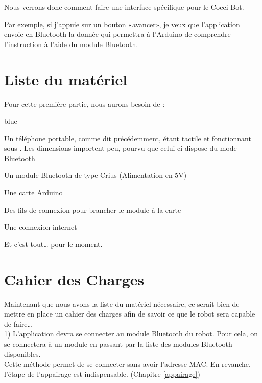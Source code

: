 \noindent
Nous verrons donc comment faire une interface spécifique pour le Cocci-Bot. \\




Par exemple, si j'appuie sur un bouton «avancer», je veux que l'application envoie en Bluetooth la donnée qui permettra à l'Arduino de comprendre l'instruction  à l'aide  du module Bluetooth.


\section{Liste du matériel}

Pour cette première partie, nous aurons besoin de : 

\begin{items}{blue}{\Triangle}
    \item Un téléphone portable, comme dit précédemment, étant tactile et fonctionnant sous . Les dimensions importent peu, pourvu que celui-ci dispose du mode Bluetooth
    \item Un module Bluetooth de type Crius (Alimentation en 5V)
    \item Une carte Arduino 
    \item Des fils de connexion pour brancher le module à la carte
    \item Une connexion internet
\end{items}

Et c'est tout… pour le moment.


\section{Cahier des Charges}

Maintenant que nous avons la liste du matériel nécessaire, ce serait bien de mettre en place un cahier des charges afin de savoir ce que le robot sera capable de faire… \\

1) L'application devra se connecter au module Bluetooth du robot.
Pour cela, on se connectera  à un module en passant par la liste des modules Bluetooth disponibles.\\
Cette méthode permet de se connecter sans avoir l'adresse MAC. En revanche, l'étape de l'appairage est indispensable. (Chapitre \ref{appairage}) \\

